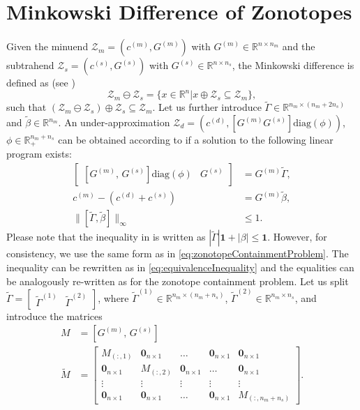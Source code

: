 \documentclass[10pt,a4paper]{article}
\renewcommand{\^}[1]{^{(#1)}}
\begin{document}
\section{Minkowski Difference of Zonotopes}

Given the minuend $\mathcal{Z}_m = (c\^m, G\^m)$ with $G\^m \in \mathbb{R}^{n \times n_m}$ and the subtrahend $\mathcal{Z}_s = (c\^s, G\^s)$ with $G\^s \in \mathbb{R}^{n \times n_s}$, the Minkowski difference is defined as (see \cite{Montejano1996})
\begin{equation*} 
 \mathcal{Z}_m\ominus \mathcal{Z}_s = \{x \in \mathbb{R}^n | x \oplus \mathcal{Z}_s \subseteq \mathcal{Z}_m \},
\end{equation*}
such that $(\mathcal{Z}_m\ominus \mathcal{Z}_s) \oplus \mathcal{Z}_s \subseteq \mathcal{Z}_m$. Let us further introduce $\tilde{\Gamma}\in \mathbb{R}^{n_m \times (n_m + 2n_s)}$ and $\tilde{\beta} \in \mathbb{R}^{n_m}$. An under-approximation $\mathcal{Z}_d = (c\^d,[G\^m G\^s]\mathrm{diag}(\phi))$, $\phi \in \mathbb{R}_+^{n_m+n_s}$ can be obtained according to \cite[Theorem~7]{Raghuraman2022} if a solution to the following linear program exists:
\begin{equation} \label{eq:minkowskiDifferenceProblem}
\begin{split}
  \begin{bmatrix} [G\^m, \, G\^s] \mathrm{diag}(\phi) & G\^s \end{bmatrix} &= G\^m \tilde{\Gamma}, \\
  c\^m -  (c\^d + c\^s) &= G\^m \tilde{\beta}, \\
  \|[\tilde{\Gamma}, \tilde{\beta}]\|_\infty &\leq 1.
\end{split}
\end{equation}
Please note that the inequality in \cite[Theorem~7]{Raghuraman2022} is written as $|\tilde{\Gamma}| \mathbf{1} + |\beta| \leq \mathbf{1}$. However, for consistency, we use the same form as in \eqref{eq:zonotopeContainmentProblem}. The inequality can be rewritten as in \eqref{eq:equivalenceInequality} and the equalities can be analogously re-written as for the zonotope containment problem. Let us split $\tilde{\Gamma} = \begin{bmatrix} \tilde{\Gamma}\^1 & \tilde{\Gamma}\^2 \end{bmatrix}$, where $\tilde{\Gamma}\^1 \in \mathbb{R}^{n_m \times (n_m + n_s)}$, $\tilde{\Gamma}\^2 \in \mathbb{R}^{n_m \times n_s}$, and introduce the matrices
\begin{equation*}
\begin{split}
 M &= [G\^m, \, G\^s] \\
 \tilde{M} &= 
 \begin{bmatrix} M_{(:,1)} & \mathbf{0}_{n \times 1} & \ldots & \mathbf{0}_{n \times 1} & \mathbf{0}_{n \times 1} \\
 \mathbf{0}_{n \times 1} & M_{(:,2)} & \mathbf{0}_{n \times 1} & \ldots & \mathbf{0}_{n \times 1} \\
 \vdots & \vdots & \vdots & \vdots & \vdots \\
 \mathbf{0}_{n \times 1} & \mathbf{0}_{n \times 1} & \ldots & \mathbf{0}_{n \times 1} & M_{(:,n_m + n_s)}
\end{bmatrix}.
\end{split}
\end{equation*}
\end{document}
